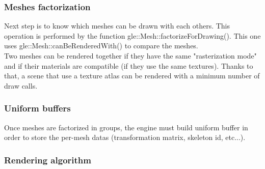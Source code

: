 \documentclass [a4 paper,11pt]{report}
\begin{document}
\subsubsection{Meshes factorization}
Next step is to know which meshes can be drawn with each others. This operation is performed by the function gle::Mesh::factorizeForDrawing(). This one uses gle::Mesh::canBeRenderedWith() to compare the meshes.\\
Two meshes can be rendered together if they have the same "rasterization mode" and if their materials are compatible (if they use the same textures). Thanks to that, a scene that use a texture atlas can be rendered with a minimum number of draw calls.

\subsubsection{Uniform buffers}
Once meshes are factorized in groups, the engine must build uniform buffer in order to store the per-mesh datas (transformation matrix, skeleton id, etc...).


\subsubsection{Rendering algorithm}
\end{document}
